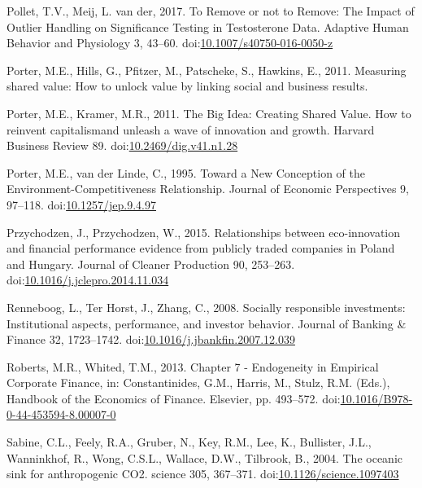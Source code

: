 \documentclass[12pt,]{article}
\begin{document}
\hypertarget{ref-Pollet2017}{}
Pollet, T.V., Meij, L. van der, 2017. To Remove or not to Remove: The
Impact of Outlier Handling on Significance Testing in Testosterone Data.
Adaptive Human Behavior and Physiology 3, 43--60.
doi:\href{https://doi.org/10.1007/s40750-016-0050-z}{10.1007/s40750-016-0050-z}

\hypertarget{ref-Porter2011a}{}
Porter, M.E., Hills, G., Pfitzer, M., Patscheke, S., Hawkins, E., 2011.
Measuring shared value: How to unlock value by linking social and
business results.

\hypertarget{ref-Porter2011}{}
Porter, M.E., Kramer, M.R., 2011. The Big Idea: Creating Shared Value.
How to reinvent capitalismand unleash a wave of innovation and growth.
Harvard Business Review 89.
doi:\href{https://doi.org/10.2469/dig.v41.n1.28}{10.2469/dig.v41.n1.28}

\hypertarget{ref-Porter1995}{}
Porter, M.E., van der Linde, C., 1995. Toward a New Conception of the
Environment-Competitiveness Relationship. Journal of Economic
Perspectives 9, 97--118.
doi:\href{https://doi.org/10.1257/jep.9.4.97}{10.1257/jep.9.4.97}

\hypertarget{ref-PrzychodzenRelationshipsecoinnovationfinancial2015}{}
Przychodzen, J., Przychodzen, W., 2015. Relationships between
eco-innovation and financial performance evidence from publicly traded
companies in Poland and Hungary. Journal of Cleaner Production 90,
253--263.
doi:\href{https://doi.org/10.1016/j.jclepro.2014.11.034}{10.1016/j.jclepro.2014.11.034}

\hypertarget{ref-Renneboog2008}{}
Renneboog, L., Ter Horst, J., Zhang, C., 2008. Socially responsible
investments: Institutional aspects, performance, and investor behavior.
Journal of Banking \& Finance 32, 1723--1742.
doi:\href{https://doi.org/10.1016/j.jbankfin.2007.12.039}{10.1016/j.jbankfin.2007.12.039}

\hypertarget{ref-Roberts2013}{}
Roberts, M.R., Whited, T.M., 2013. Chapter 7 - Endogeneity in Empirical
Corporate Finance, in: Constantinides, G.M., Harris, M., Stulz, R.M.
(Eds.), Handbook of the Economics of Finance. Elsevier, pp. 493--572.
doi:\href{https://doi.org/10.1016/B978-0-44-453594-8.00007-0}{10.1016/B978-0-44-453594-8.00007-0}

\hypertarget{ref-Sabine2004}{}
Sabine, C.L., Feely, R.A., Gruber, N., Key, R.M., Lee, K., Bullister,
J.L., Wanninkhof, R., Wong, C.S.L., Wallace, D.W., Tilbrook, B., 2004.
The oceanic sink for anthropogenic CO2. science 305, 367--371.
doi:\href{https://doi.org/10.1126/science.1097403}{10.1126/science.1097403}
\end{document}
